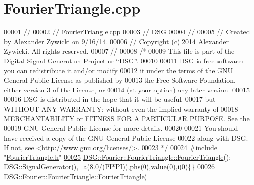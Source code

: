 \hypertarget{_fourier_triangle_8cpp_source}{\section{Fourier\+Triangle.\+cpp}
\label{_fourier_triangle_8cpp_source}
}

\begin{DoxyCode}
00001 \textcolor{comment}{//}
00002 \textcolor{comment}{//  FourierTriangle.cpp}
00003 \textcolor{comment}{//  DSG}
00004 \textcolor{comment}{//}
00005 \textcolor{comment}{//  Created by Alexander Zywicki on 9/16/14.}
00006 \textcolor{comment}{//  Copyright (c) 2014 Alexander Zywicki. All rights reserved.}
00007 \textcolor{comment}{//}
00008 \textcolor{comment}{/*}
00009 \textcolor{comment}{ This file is part of the Digital Signal Generation Project or “DSG”.}
00010 \textcolor{comment}{}
00011 \textcolor{comment}{ DSG is free software: you can redistribute it and/or modify}
00012 \textcolor{comment}{ it under the terms of the GNU General Public License as published by}
00013 \textcolor{comment}{ the Free Software Foundation, either version 3 of the License, or}
00014 \textcolor{comment}{ (at your option) any later version.}
00015 \textcolor{comment}{}
00016 \textcolor{comment}{ DSG is distributed in the hope that it will be useful,}
00017 \textcolor{comment}{ but WITHOUT ANY WARRANTY; without even the implied warranty of}
00018 \textcolor{comment}{ MERCHANTABILITY or FITNESS FOR A PARTICULAR PURPOSE.  See the}
00019 \textcolor{comment}{ GNU General Public License for more details.}
00020 \textcolor{comment}{}
00021 \textcolor{comment}{ You should have received a copy of the GNU General Public License}
00022 \textcolor{comment}{ along with DSG.  If not, see <http://www.gnu.org/licenses/>.}
00023 \textcolor{comment}{ */}
00024 \textcolor{preprocessor}{#include "\hyperlink{_fourier_triangle_8h}{FourierTriangle.h}"}
\hypertarget{_fourier_triangle_8cpp_source_l00025}{}\hyperlink{class_d_s_g_1_1_fourier_1_1_fourier_triangle_a4129c053eddd87256ae39552a06ce329}{00025} \hyperlink{class_d_s_g_1_1_fourier_1_1_fourier_triangle_a4129c053eddd87256ae39552a06ce329}{DSG::Fourier::FourierTriangle::FourierTriangle}():
      \hyperlink{namespace_d_s_g}{DSG}::\hyperlink{class_d_s_g_1_1_signal_generator}{SignalGenerator}(),\_a(8.0/(\hyperlink{_p_i_8h_a598a3330b3c21701223ee0ca14316eca}{PI}*\hyperlink{_p_i_8h_a598a3330b3c21701223ee0ca14316eca}{PI})),phs(0),value(0),i(0)\{\}
\hypertarget{_fourier_triangle_8cpp_source_l00026}{}\hyperlink{class_d_s_g_1_1_fourier_1_1_fourier_triangle_abf887c6f5aada92780224511988cb688}{00026} \hyperlink{class_d_s_g_1_1_fourier_1_1_fourier_triangle_a4129c053eddd87256ae39552a06ce329}{DSG::Fourier::FourierTriangle::FourierTriangle}(

\end{DoxyCode}
